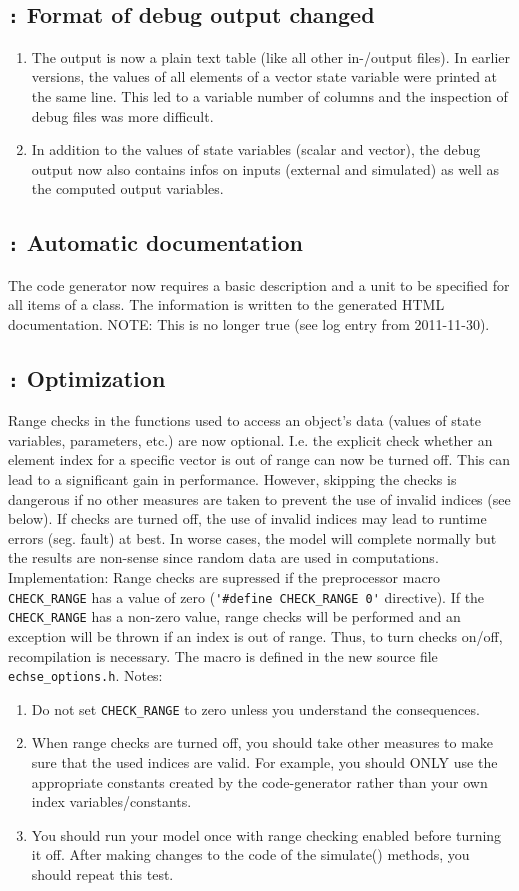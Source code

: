 \documentclass[a4paper,10pt]{article}
\newcommand{\logentry}[2]{\subsection*{\texttt{\color{red}{#1}:} \large{\textbf{#2}}}}
\begin{document}

\logentry{2011-10-19}{Format of debug output changed}
\begin{enumerate}
  \item The output is now a plain text table (like all other in-/output files). In earlier versions, the values of all elements of a vector state variable were printed at the same line. This led to a variable number of columns and the inspection of debug files was more difficult.
  \item In addition to the values of state variables (scalar and vector), the debug output now also contains infos on inputs (external and simulated) as well as the computed output variables.
\end{enumerate}


\logentry{2011-10-14}{Automatic documentation} The code generator now requires a basic description and a unit to be specified for all items of a class. The information is written to the generated HTML documentation. NOTE: This is no longer true (see log entry from 2011-11-30).


\logentry{2011-10-11}{Optimization} Range checks in the functions used to access an object's data (values of state variables, parameters, etc.) are now optional. I.e. the explicit check whether an element index for a specific vector is out of range can now be turned off. This can lead to a significant gain in performance. However, skipping the checks is dangerous if no other measures are taken to prevent the use of invalid indices (see below). If checks are turned off, the use of invalid indices may lead to runtime errors (seg. fault) at best. In worse cases, the model will complete normally but the results are non-sense since random data are used in computations.
Implementation: Range checks are supressed if the preprocessor macro \verb!CHECK_RANGE! has a value of zero (\verb!'#define CHECK_RANGE 0'! directive). If the \verb!CHECK_RANGE! has a non-zero value, range checks will be performed and an exception will be thrown if an index is out of range. Thus, to turn checks on/off, recompilation is necessary. The macro is defined in the new source file \verb!echse_options.h!. Notes:
\begin{enumerate}
  \item Do not set \verb!CHECK_RANGE! to zero unless you understand the consequences.
  \item When range checks are turned off, you should take other measures to make sure that the used indices are valid. For example, you should ONLY use the appropriate constants created by the code-generator rather than your own index variables/constants.
  \item You should run your model once with range checking enabled before turning it off. After making changes to the code of the simulate() methods, you should repeat this test.
\end{enumerate}
\end{document}
